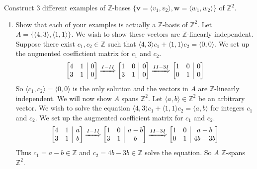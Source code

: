 \documentclass[12pt]{article}
\makeatletter
\newenvironment{amatrix}[1]{%
            \left[\begin{array}{@{}*{#1}{c}|c@{}}
        }{%
            \end{array}\right]
        }
\newcommand{\Z}{\mathbb{Z}}
\newenvironment{exercise}[2][Exercise]{\begin{trivlist}
        \item[\hskip \labelsep {\bfseries #1}\hskip \labelsep {\bfseries #2.}]}{\end{trivlist}}
\makeatother
\begin{document}
\begin{exercise}{38}
    Construct 3 different examples of \( \Z \)-bases \( \{ \mathbf{v} = \langle v_{1} , v_{2} \rangle , \mathbf{w} = \langle w_{1} , w_{2} \rangle \} \) of \( \Z^{2} . \)
    \begin{enumerate}[label=(\alph*)]
        \item Show that each of your examples is actually a \( \Z \)-basis of \( \Z^{2} . \)
            Let \( A = \{ \langle 4,3 \rangle , \langle 1,1 \rangle \} . \) We wish to show these vectors are \( \Z \)-linearly independent. Suppose there exist \( c_{1} , c_{2} \in \Z \) such that \( \langle 4,3 \rangle c_{1} + \langle 1,1 \rangle c_{2} = \langle 0,0 \rangle . \) We set up the augmented coeffictient matrix for \( c_{1} \) and \( c_{2} . \)
            \begin{align*}
                \begin{amatrix}{2}
                4 & 1 & 0\\
                3 & 1 & 0
                \end{amatrix} \xRightarrow{I - II}
                \begin{amatrix}{2}
                1 & 0 & 0\\
                3 & 1 & 0
                \end{amatrix}\xRightarrow{II - 3I}
                \begin{amatrix}{2}
                1 & 0 & 0\\
                0 & 1 & 0
                \end{amatrix}
            \end{align*}
            So \( \langle c_{1} , c_{2} \rangle = \langle 0,0 \rangle \) is the only solution and the vectors in \( A \) are \( \Z \)-linearly independent. We will now show \( A \) spans \( \Z^{2} . \) Let \( \langle a,b\rangle \in \Z^{2}  \) be an arbitrary vector. We wish to solve the equation \( \langle 4,3 \rangle c_{1} + \langle 1,1 \rangle c_{2} = \langle a,b \rangle  \) for integers \( c_{1} \) and \( c_{2} . \) We set up the augmented coefficient matrix for \( c_{1} \) and \( c_{2} . \)
            \begin{align*}
                \begin{amatrix}{2}
                4 & 1 & a\\
                3 & 1 & b
                \end{amatrix} \xRightarrow{I - II}
                \begin{amatrix}{2}
                1 & 0 & a-b\\
                3 & 1 & b
                \end{amatrix}\xRightarrow{II - 3I}
                \begin{amatrix}{2}
                1 & 0 & a-b\\
                0 & 1 & 4b-3b
                \end{amatrix}
            \end{align*}
            Thus \( c_{1} = a-b \in \Z \) and \( c_{2} = 4b-3b \in \Z \) solve the equation. So \( A \) \( \Z \)-spans \( \Z^{2} . \)


\end{enumerate}
\end{exercise}
\end{document}
